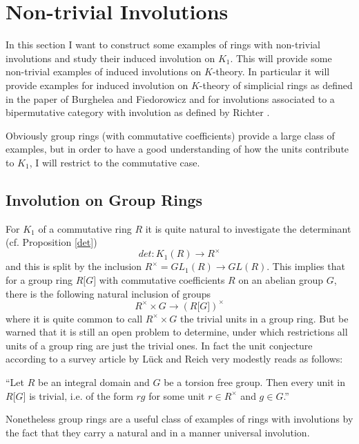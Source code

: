 \chapter{Non-trivial Involutions}
In this section I want to construct some examples of rings with non-trivial involutions and study their induced involution on $K_1$. This
will provide some non-trivial examples of induced involutions on $K$-theory. In particular it will provide examples for induced involution on
$K$-theory of simplicial rings as defined in the paper of Burghelea and Fiedorowicz \cite{BF} and for involutions associated to a
bipermutative category with involution as defined by Richter \cite{richter2010involution}.

Obviously group rings (with commutative coefficients) provide a large class of examples, but in order to have a good understanding of how the
units contribute to $K_1$, I will restrict to the commutative case.

\section{Involution on Group Rings}
For $K_1$ of a commutative ring $R$ it is quite natural to investigate the determinant (cf. Proposition \ref{det})
$$det \colon K_1(R) \rightarrow R^{\times}$$
and this is split by the inclusion $R^\times = GL_1(R) \rightarrow GL(R)$. This implies that for a group ring $R\lbrack G\rbrack$ with commutative
coefficients $R$ on an abelian group $G$, there is the following natural inclusion of groups
$$R^\times \times G \rightarrow (R\lbrack G \rbrack)^\times$$ where it is quite common to call $R^\times \times G$ the trivial units
\label{units} in a group ring. But be warned that it is still an open problem to determine, under which restrictions all units of a group ring are just
the trivial ones. In fact the unit conjecture according to a survey article by L\"uck and Reich \cite{khandbookarXiv} very modestly
reads as follows:

 ``Let $R$ be an integral domain and $G$ be a torsion free group. Then every unit in $R\lbrack G \rbrack$ is trivial,
i.e. of the form $rg$ for some unit $r\in R^\times$ and $g\in G$.''

Nonetheless group rings are a useful class of examples of rings with involutions by the fact that they carry a natural
and in a manner universal involution.

